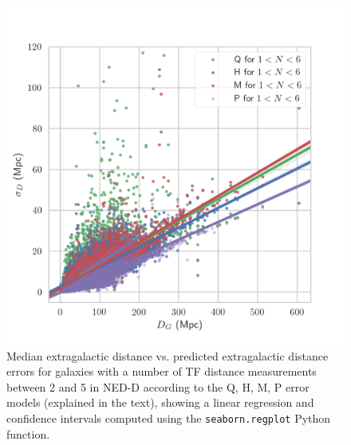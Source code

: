 \documentclass[a4paper,fleqn,usenatbib]{mnras}
\begin{document}
\begin{figure}
	\includegraphics[scale=0.7]{hqmlow.png}
    \caption{Median extragalactic distance vs. predicted extragalactic distance errors for galaxies with a number of TF distance measurements between 2 and 5 in NED-D according to the Q, H, M, P error models (explained in the text), showing a linear regression and confidence intervals computed using the \texttt{seaborn.regplot} Python function.}
    \label{fig:hqmlow}
\end{figure}
\end{document}
